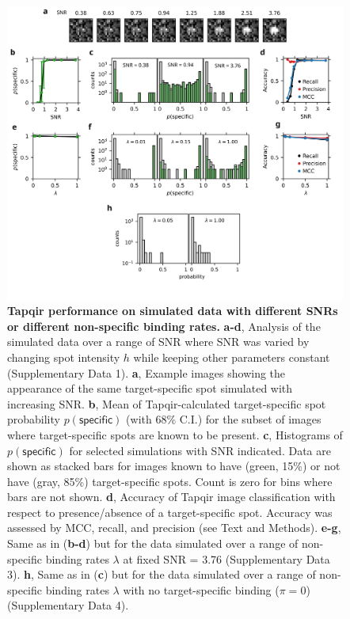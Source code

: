\begin{figure}[t]
\centering
\includegraphics[width=1\textwidth]{figures/figure5/figure5.png}
\caption{\textbf{Tapqir performance on simulated data with different SNRs or different non-specific binding rates.} \textbf{a-d}, Analysis of the simulated data over a range of SNR where SNR was varied by changing spot intensity  $h$ while keeping other parameters constant (Supplementary Data 1). \textbf{a}, Example images showing the appearance of the same target-specific spot simulated with increasing SNR.   \textbf{b}, Mean of Tapqir-calculated target-specific spot probability $p(\mathsf{specific})$ (with 68\% C.I.) for the subset of images where target-specific spots  are known to be present. \textbf{c}, Histograms of $p(\mathsf{specific})$ for selected simulations with SNR indicated. Data are shown as stacked bars for images known to have (green, 15\%) or not have (gray, 85\%) target-specific spots.  Count is zero for bins where bars are not shown. \textbf{d}, Accuracy of Tapqir image classification with respect to presence/absence of a target-specific spot. Accuracy was assessed by MCC, recall, and precision (see Text and Methods). \textbf{e-g}, Same as in (\textbf{b-d}) but for the data simulated over a range of non-specific binding rates $\lambda$ at fixed SNR = 3.76 (Supplementary Data 3). \textbf{h}, Same as in (\textbf{c}) but for the data simulated over a range of non-specific binding rates $\lambda$ with no target-specific binding ($\pi = 0$) (Supplementary Data 4).}
\label{fig:tapqir_performance}
\end{figure}


